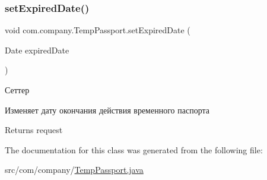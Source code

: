 \subsubsection{\texorpdfstring{set\+Expired\+Date()}{setExpiredDate()}}
{\footnotesize\ttfamily void com.\+company.\+Temp\+Passport.\+set\+Expired\+Date (\begin{DoxyParamCaption}\item[{Date}]{expired\+Date }\end{DoxyParamCaption})\hspace{0.3cm}{\ttfamily [inline]}}



Сеттер 

Изменяет дату окончания действия временного паспорта \begin{DoxyReturn}{Returns}
request 
\end{DoxyReturn}


The documentation for this class was generated from the following file\+:\begin{DoxyCompactItemize}
\item 
src/com/company/\mbox{\hyperlink{TempPassport_8java}{Temp\+Passport.\+java}}\end{DoxyCompactItemize}
